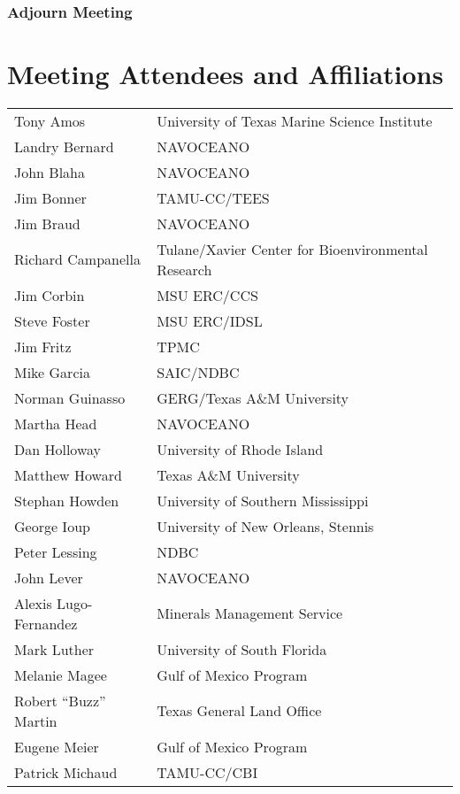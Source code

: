 \subsubsection{Adjourn Meeting}

\section{Meeting Attendees and Affiliations}
\label{I,attendees}

\begin{center}
\begin{tabular}[t]{ll}
Tony Amos &          University of Texas Marine Science Institute \\
Landry Bernard &     NAVOCEANO \\
John Blaha &         NAVOCEANO \\
Jim Bonner &         TAMU-CC/TEES \\
Jim Braud &          NAVOCEANO \\
Richard Campanella & Tulane/Xavier Center for Bioenvironmental
Research \\
Jim Corbin &         MSU ERC/CCS \\
Steve Foster &       MSU ERC/IDSL \\
Jim Fritz &          TPMC \\
Mike Garcia &        SAIC/NDBC \\
Norman Guinasso &    GERG/Texas A\&M University \\
Martha Head &        NAVOCEANO \\
Dan Holloway &       University of Rhode Island \\
Matthew Howard &     Texas A\&M University \\
Stephan Howden &     University of Southern Mississippi \\
George Ioup &        University of New Orleans, Stennis \\
Peter Lessing &      NDBC \\
John Lever &         NAVOCEANO \\
Alexis Lugo-Fernandez & Minerals Management Service \\
Mark Luther &        University of South Florida \\
Melanie Magee &      Gulf of Mexico Program \\
Robert ``Buzz'' Martin & Texas General Land Office \\
Eugene Meier &       Gulf of Mexico Program \\
Patrick Michaud &    TAMU-CC/CBI \\

\end{tabular}
\end{center}
